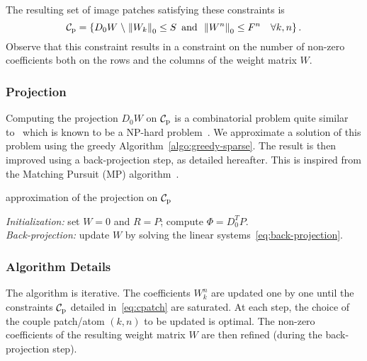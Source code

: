 The resulting set of image patches satisfying these constraints is
\begin{equation}
  \label{eq:cpatch}
  {\mathcal{C}_{\mathrm{p}}} = \left\{D_0 W \mathrel{}\middle\backslash\mathrel{}
    \left\|W_k\right\|_0 \leq S \enskip\text{and}\enskip
    \left\|W^n\right\|_0 \leq F^n \quad \forall k,n
  \right\}.
\end{equation}
Observe that this constraint results in a constraint on the number of non-zero coefficients both on the rows and the columns of the weight matrix $W$.


\subsubsection{Projection}

Computing the projection $D_0 W$ on ${\mathcal{C}_{\mathrm{p}}}$ is a combinatorial problem quite similar to~\cite{elad2006image} which is known to be a NP-hard problem~\cite{tropp2004greed}.
We approximate a solution of this problem using the greedy Algorithm~\ref{algo:greedy-sparse}.
The result is then improved using a back-projection step, as detailed hereafter.
This is inspired from the Matching Pursuit (MP) algorithm~\cite{mallat1993matching}.

\begin{algorithm}
  \caption{approximation of the projection on ${\mathcal{C}_{\mathrm{p}}}$}
  \label{algo:greedy-sparse}


  \emph{Initialization:} set $W=0$ and $R=P$; compute $\Phi=D_0^T P$.\\
  \emph{Back-projection:} update $W$ by solving the linear systems~\eqref{eq:back-projection}.
\end{algorithm}


\subsubsection{Algorithm Details}

The algorithm is iterative.
The coefficients $W_k^n$ are updated one by one until the constraints ${\mathcal{C}_{\mathrm{p}}}$ detailed in~\eqref{eq:cpatch} are saturated.
At each step, the choice of the couple patch/atom $(k,n)$ to be updated is optimal.
The non-zero coefficients of the resulting weight matrix $W$ are then refined (during the back-projection step).


